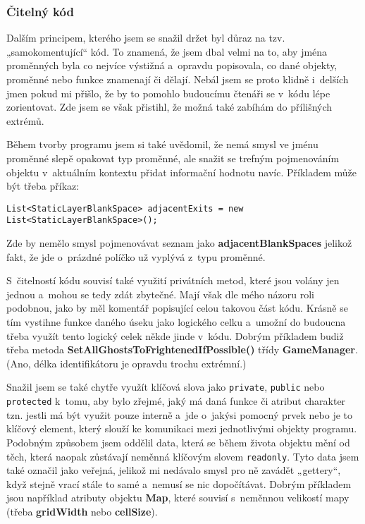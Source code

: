 \documentclass[a4]{article}
\begin{document}
\subsubsection{Čitelný kód}
Dalším principem, kterého jsem se snažil držet byl důraz na tzv. „samokomentující“ kód. To znamená, že jsem dbal velmi na to, aby jména proměnných byla co nejvíce výstižná a~opravdu popisovala, co dané objekty, proměnné nebo funkce znamenají či dělají. Nebál jsem se proto klidně i~delších jmen pokud mi přišlo, že by to pomohlo budoucímu čtenáři se v~kódu lépe zorientovat. Zde jsem se však přistihl, že možná také zabíhám do přílišných extrémů.

Během tvorby programu jsem si také uvědomil, že nemá smysl ve jménu proměnné slepě opakovat typ proměnné, ale snažit se trefným pojmenováním objektu v~aktuálním kontextu přidat informační hodnotu navíc. Příkladem může být třeba příkaz: 

\verb|List<StaticLayerBlankSpace> adjacentExits = new List<StaticLayerBlankSpace>();|

Zde by nemělo smysl pojmenovávat seznam jako \textbf{adjacentBlankSpaces} jelikož fakt, že jde o~prázdné políčko už vyplývá z~typu proměnné.

S~čitelností kódu souvisí také využití privátních metod, které jsou volány jen jednou a~mohou se tedy zdát zbytečné. Mají však dle mého názoru roli podobnou, jako by měl komentář popisující celou takovou část kódu. Krásně se tím vystihne funkce daného úseku jako logického celku a~umožní do budoucna třeba využít tento logický celek někde jinde v~kódu. Dobrým příkladem budiž třeba metoda \textbf{SetAllGhostsToFrightenedIfPossible()} třídy \textbf{GameManager}. (Ano, délka identifikátoru je opravdu trochu extrémní.)

Snažil jsem se také chytře využít klíčová slova jako \verb|private|, \verb|public| nebo \verb|protected| k~tomu, aby bylo zřejmé, jaký má daná funkce či atribut charakter tzn. jestli má být využit pouze interně a~jde o~jakýsi pomocný prvek nebo je to klíčový element, který slouží ke komunikaci mezi jednotlivými objekty programu. Podobným způsobem jsem oddělil data, která se během života objektu mění od těch, která naopak zůstávají neměnná klíčovým slovem \verb|readonly|. Tyto data jsem také označil jako veřejná, jelikož mi nedávalo smysl pro ně zavádět „gettery“, když stejně vrací stále to samé a~nemusí se nic dopočítávat. Dobrým příkladem jsou například atributy objektu \textbf{Map}, které souvisí s~neměnnou velikostí mapy (třeba \textbf{gridWidth} nebo \textbf{cellSize}).
\end{document}
